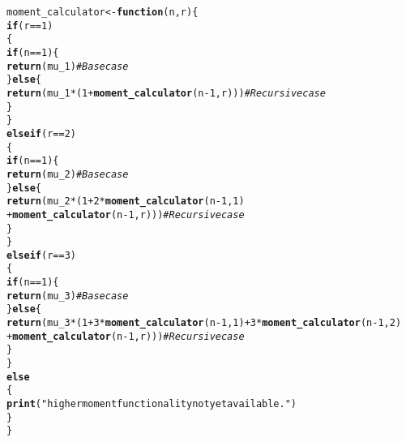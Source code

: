 \documentclass[]{article}\usepackage[]{graphicx}\usepackage[]{color}
\makeatletter
\newcommand{\hlnum}[1]{\textcolor[rgb]{0.686,0.059,0.569}{#1}}%
\newcommand{\hlstr}[1]{\textcolor[rgb]{0.192,0.494,0.8}{#1}}%
\newcommand{\hlcom}[1]{\textcolor[rgb]{0.678,0.584,0.686}{\textit{#1}}}%
\newcommand{\hlopt}[1]{\textcolor[rgb]{0,0,0}{#1}}%
\newcommand{\hlstd}[1]{\textcolor[rgb]{0.345,0.345,0.345}{#1}}%
\newcommand{\hlkwa}[1]{\textcolor[rgb]{0.161,0.373,0.58}{\textbf{#1}}}%
\newcommand{\hlkwb}[1]{\textcolor[rgb]{0.69,0.353,0.396}{#1}}%
\newcommand{\hlkwc}[1]{\textcolor[rgb]{0.333,0.667,0.333}{#1}}%
\newcommand{\hlkwd}[1]{\textcolor[rgb]{0.737,0.353,0.396}{\textbf{#1}}}%
\newenvironment{kframe}{%
 \def\at@end@of@kframe{}%
 \ifinner\ifhmode%
  \def\at@end@of@kframe{\end{minipage}}%
  \begin{minipage}{\columnwidth}%
 \fi\fi%
 \def\FrameCommand##1{\hskip\@totalleftmargin \hskip-\fboxsep
 \colorbox{shadecolor}{##1}\hskip-\fboxsep
     \hskip-\linewidth \hskip-\@totalleftmargin \hskip\columnwidth}%
 \MakeFramed {\advance\hsize-\width
   \@totalleftmargin\z@ \linewidth\hsize
   \@setminipage}}%
 {\par\unskip\endMakeFramed%
 \at@end@of@kframe}
\newenvironment{knitrout}{}{} %
\makeatother
\begin{document}
\begin{knitrout}
\color{fgcolor}\begin{kframe}
\begin{alltt}
\hlstd{moment_calculator} \hlkwb{<-} \hlkwa{function} \hlstd{(}\hlkwc{n}\hlstd{,} \hlkwc{r}\hlstd{) \{}
  \hlkwa{if} \hlstd{(r} \hlopt{==} \hlnum{1}\hlstd{)}
  \hlstd{\{}
    \hlkwa{if} \hlstd{(n} \hlopt{==} \hlnum{1}\hlstd{) \{}
      \hlkwd{return}\hlstd{( mu_1 )} \hlcom{#Base case}
    \hlstd{\}} \hlkwa{else} \hlstd{\{}
      \hlkwd{return} \hlstd{(mu_1} \hlopt{*} \hlstd{(}\hlnum{1} \hlopt{+} \hlkwd{moment_calculator}\hlstd{(n} \hlopt{-} \hlnum{1}\hlstd{, r)))} \hlcom{#Recursive case}
    \hlstd{\}}
  \hlstd{\}}
  \hlkwa{else if} \hlstd{(r} \hlopt{==} \hlnum{2}\hlstd{)}
  \hlstd{\{}
    \hlkwa{if} \hlstd{(n} \hlopt{==} \hlnum{1}\hlstd{) \{}
      \hlkwd{return}\hlstd{( mu_2 )} \hlcom{#Base case}
    \hlstd{\}} \hlkwa{else} \hlstd{\{}
      \hlkwd{return} \hlstd{(mu_2} \hlopt{*} \hlstd{(}\hlnum{1} \hlopt{+} \hlnum{2} \hlopt{*} \hlkwd{moment_calculator}\hlstd{(n} \hlopt{-} \hlnum{1}\hlstd{,} \hlnum{1}\hlstd{)}
                      \hlopt{+} \hlkwd{moment_calculator}\hlstd{(n} \hlopt{-} \hlnum{1}\hlstd{, r)))} \hlcom{#Recursive case}
    \hlstd{\}}
  \hlstd{\}}
  \hlkwa{else if} \hlstd{(r} \hlopt{==} \hlnum{3}\hlstd{)}
  \hlstd{\{}
    \hlkwa{if} \hlstd{(n} \hlopt{==} \hlnum{1}\hlstd{) \{}
      \hlkwd{return}\hlstd{( mu_3 )} \hlcom{#Base case}
    \hlstd{\}} \hlkwa{else} \hlstd{\{}
      \hlkwd{return} \hlstd{(mu_3} \hlopt{*} \hlstd{(}\hlnum{1} \hlopt{+} \hlnum{3} \hlopt{*} \hlkwd{moment_calculator}\hlstd{(n} \hlopt{-} \hlnum{1}\hlstd{,} \hlnum{1}\hlstd{)} \hlopt{+} \hlnum{3} \hlopt{*} \hlkwd{moment_calculator}\hlstd{(n} \hlopt{-} \hlnum{1}\hlstd{,} \hlnum{2}\hlstd{)}
                      \hlopt{+} \hlkwd{moment_calculator}\hlstd{(n} \hlopt{-} \hlnum{1}\hlstd{, r)))} \hlcom{#Recursive case}
    \hlstd{\}}
  \hlstd{\}}
  \hlkwa{else}
  \hlstd{\{}
    \hlkwd{print}\hlstd{(}\hlstr{"higher moment functionality not yet available."}\hlstd{)}
  \hlstd{\}}
\hlstd{\}}
\end{alltt}
\end{kframe}
\end{knitrout}
\end{document}
